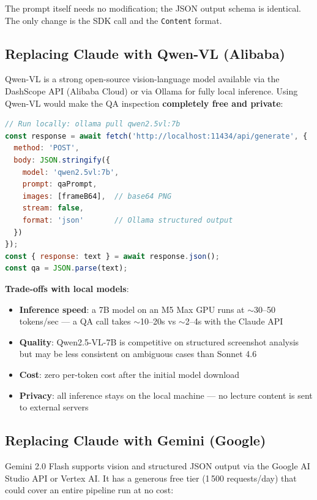 \documentclass[12pt,a4paper]{article}
\begin{document}
The prompt itself needs no modification; the JSON output schema is identical.
The only change is the SDK call and the \texttt{Content} format.

\subsection{Replacing Claude with Qwen-VL (Alibaba)}

Qwen-VL is a strong open-source vision-language model available via the
DashScope API (Alibaba Cloud) or via Ollama for fully local inference. Using
Qwen-VL would make the QA inspection \textbf{completely free and private}:

\begin{lstlisting}[language=JavaScript,caption=QA inspector with Qwen-VL via Ollama]
// Run locally: ollama pull qwen2.5vl:7b
const response = await fetch('http://localhost:11434/api/generate', {
  method: 'POST',
  body: JSON.stringify({
    model: 'qwen2.5vl:7b',
    prompt: qaPrompt,
    images: [frameB64],  // base64 PNG
    stream: false,
    format: 'json'       // Ollama structured output
  })
});
const { response: text } = await response.json();
const qa = JSON.parse(text);
\end{lstlisting}

\textbf{Trade-offs with local models}:
\begin{itemize}[leftmargin=2em]
  \item \textbf{Inference speed}: a 7B model on an M5 Max GPU runs at
        $\sim$30--50 tokens/sec --- a QA call takes $\sim$10--20s vs
        $\sim$2--4s with the Claude API
  \item \textbf{Quality}: Qwen2.5-VL-7B is competitive on structured
        screenshot analysis but may be less consistent on ambiguous cases
        than Sonnet 4.6
  \item \textbf{Cost}: zero per-token cost after the initial model download
  \item \textbf{Privacy}: all inference stays on the local machine --- no
        lecture content is sent to external servers
\end{itemize}

\subsection{Replacing Claude with Gemini (Google)}

Gemini 2.0 Flash supports vision and structured JSON output via the Google
AI Studio API or Vertex AI. It has a generous free tier (1\,500 requests/day)
that could cover an entire pipeline run at no cost:
\end{document}
